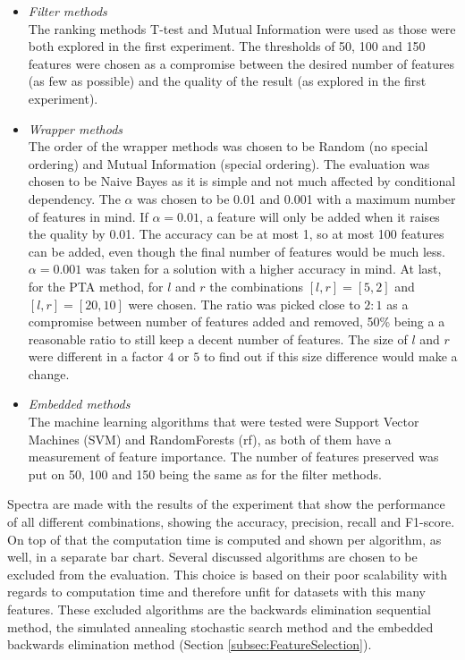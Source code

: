 \documentclass[10pt,a4paper]{article}
\begin{document}
	\begin{itemize}
		\item \textit{Filter methods} \\
		The ranking methods T-test and Mutual Information were used as those were both explored in the first experiment. The thresholds of 50, 100 and 150 features were chosen as a compromise between the desired number of features (as few as possible) and the quality of the result (as explored in the first experiment).
		\item \textit{Wrapper methods} \\
		The order of the wrapper methods was chosen to be Random (no special ordering) and Mutual Information (special ordering). The evaluation was chosen to be Naive Bayes as it is simple and not much affected by conditional dependency. The $\alpha$ was chosen to be 0.01 and 0.001 with a maximum number of features in mind. If $\alpha= 0.01$, a feature will only be added when it raises the quality by 0.01. The accuracy can be at most 1, so at most 100 features can be added, even though the final number of features would be much less. $\alpha = 0.001$ was taken for a solution with a higher accuracy in mind. At last, for the PTA method, for $l$ and $r$ the combinations $[l, r] = [5, 2]$ and $[l, r] = [20, 10]$ were chosen. The ratio was picked close to $2:1$ as a compromise between number of features added and removed, 50\% being a a reasonable ratio to still keep a decent number of features. The size of $l$ and $r$ were different in a factor $4$ or $5$ to find out if this size difference would make a change.
		\item \textit{Embedded methods} \\
		The machine learning algorithms that were tested were Support Vector Machines (SVM) and RandomForests (rf), as both of them have a measurement of feature importance. The number of features preserved was put on 50, 100 and 150 being the same as for the filter methods.
		
		
	\end{itemize}
	 Spectra are made with the results of the experiment that show the performance of all different combinations, showing the accuracy, precision, recall and F1-score. On top of that the computation time is computed and shown per algorithm, as well, in a separate bar chart.
	Several discussed algorithms  are chosen to be excluded from the evaluation. This choice is based on their poor scalability with regards to computation time and therefore unfit for datasets with this many features. These excluded algorithms are the backwards elimination sequential method, the simulated annealing stochastic search method and the embedded backwards elimination method (Section \ref{subsec:FeatureSelection}). 
\end{document}
